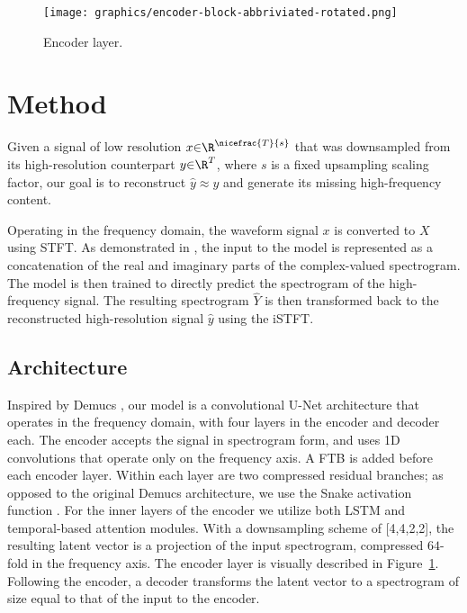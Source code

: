

\begin{figure}[t!]
    \centering
    \texttt{[image: graphics/encoder-block-abbriviated-rotated.png]}
    \caption{Encoder layer.}
    \label{fig:encoder-block}
\end{figure}

\vspace{-0.2cm}
\section{Method}
\label{sec:model}





Given a signal of low resolution $x{\in}\R^{\nicefrac{T}{s}}$ that was downsampled from its high-resolution counterpart $y{\in}\R^{T}$, where $s$ is a fixed upsampling scaling factor, our goal is to reconstruct $\hat{y}\approx{y}$ and generate its missing high-frequency content.

Operating in the frequency domain, the waveform signal $x$ is converted to $X$ using \ac{STFT}. As demonstrated in \cite{choi}, the input to the model is represented as a concatenation of the real and imaginary parts of the complex-valued spectrogram. The model is then trained to directly predict the spectrogram of the high-frequency signal. The resulting spectrogram $\hat{Y}$ is then transformed back to the reconstructed high-resolution signal $\hat{y}$ using the \ac{iSTFT}.
\vspace{-0.2cm}
\subsection{Architecture}

Inspired by Demucs \cite{hdemucs}, our model is a convolutional U-Net architecture that operates in the frequency domain, with four layers in the encoder and decoder each. 
The encoder accepts the signal in spectrogram form, and uses 1D convolutions that operate only on the frequency axis. A \ac{FTB} \cite{phasen} is added before each encoder layer. Within each layer are two compressed residual branches; as opposed to the original Demucs architecture, we use the Snake activation function \cite{snake}. For the inner layers of the encoder we utilize both LSTM and temporal-based attention modules. With a downsampling scheme of [4,4,2,2], the resulting latent vector is a projection of the input spectrogram, compressed $64$-fold in the frequency axis. The encoder layer is visually described in Figure~\ref{fig:encoder-block}. Following the encoder, a decoder transforms the latent vector to a spectrogram of size equal to that of the input to the encoder.

